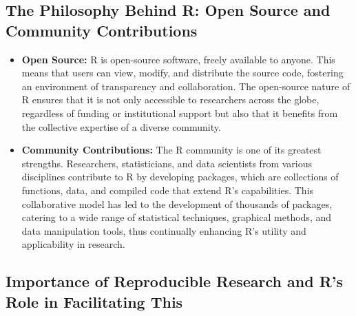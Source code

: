 \documentclass[
]{book}
\begin{document}
\subsection*{The Philosophy Behind R: Open Source and Community Contributions}\label{the-philosophy-behind-r-open-source-and-community-contributions}

\begin{itemize}
\item
  \textbf{Open Source:} R is open-source software, freely available to anyone. This means that users can view, modify, and distribute the source code, fostering an environment of transparency and collaboration. The open-source nature of R ensures that it is not only accessible to researchers across the globe, regardless of funding or institutional support but also that it benefits from the collective expertise of a diverse community.
\item
  \textbf{Community Contributions:} The R community is one of its greatest strengths. Researchers, statisticians, and data scientists from various disciplines contribute to R by developing packages, which are collections of functions, data, and compiled code that extend R's capabilities. This collaborative model has led to the development of thousands of packages, catering to a wide range of statistical techniques, graphical methods, and data manipulation tools, thus continually enhancing R's utility and applicability in research.
\end{itemize}

\subsection*{Importance of Reproducible Research and R's Role in Facilitating This}\label{importance-of-reproducible-research-and-rs-role-in-facilitating-this}
\end{document}
